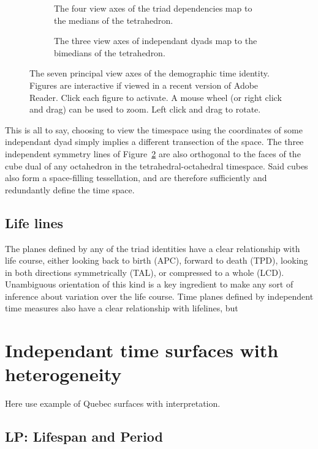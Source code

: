 \begin{figure}
\begin{subfigure}{.48\textwidth}

\caption{The four view axes of the triad dependencies map to the medians of the
tetrahedron.}
\label{fig:depviewaxes}
\end{subfigure}
\begin{subfigure}{.48\textwidth}

\caption{The three view axes of independant dyads map to the bimedians of the
tetrahedron.}
\label{fig:indepviewaxes}
\end{subfigure}
\caption{The seven principal view axes of the demographic time identity.
Figures are interactive if viewed in a recent version of Adobe Reader. Click
each figure to activate. A mouse wheel (or right click and drag) can be used to
zoom. Left click and drag to rotate.}
\label{fig:viewaxes}
\end{figure}

This is all to say, choosing to view the timespace using the coordinates of
some independant dyad simply implies a different transection of the space.
The three independent symmetry lines of Figure~\ref{fig:indepviewaxes} are
also orthogonal to the faces of the cube dual of any octahedron in the
tetrahedral-octahedral timespace. Said cubes also form a space-filling
tessellation, and are therefore sufficiently and redundantly define the time
space.

\subsection{Life lines}
The planes defined by any of the triad identities have a clear relationship with
life course, either looking back to birth (APC), forward to death (TPD),
looking in both directions symmetrically (TAL), or compressed to a whole (LCD).
Unambiguous orientation of this kind is a key ingredient to make any sort of
inference about variation over the life course. Time planes defined by independent time measures also have a clear
relationship with lifelines, but 


\section{Independant time surfaces with heterogeneity}
Here use example of Quebec surfaces with interpretation.
\subsection{LP: Lifespan and Period}

